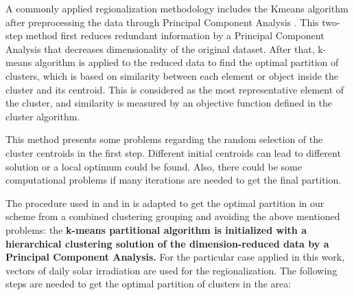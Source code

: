 
A commonly applied regionalization methodology includes the Kmeans algorithm after preprocessing the data through Principal Component Analysis \cite*{Ding2004}. This two-step method first reduces redundant information by a Principal Component Analysis that decreases dimensionality of the original dataset. After that, k-means algorithm is applied to the reduced data to find the optimal partition of clusters, which is based on similarity between each element or object inside the cluster and its centroid. This is considered as the most representative element of the cluster, and similarity is measured by an objective function defined in the cluster algorithm.

This method presents some problems regarding the random selection of the cluster centroids in the first step. Different initial centroids can lead to different solution or a local optimum could be found. Also, there could be some computational problems if many iterations are needed to get the final partition.

The procedure used in \cite{Argueso2011} and in \cite{Zagouras2014} is adapted to get the optimal partition in our scheme from a combined clustering grouping and avoiding the above mentioned problems: the \textbf{k-means partitional algorithm is initialized with a hierarchical clustering solution of the dimension-reduced data by a Principal Component Analysis.} For the particular case applied in this work, vectors of daily solar irradiation are used for the regionalization. The following steps are needed to get the optimal partition of clusters in the area:

